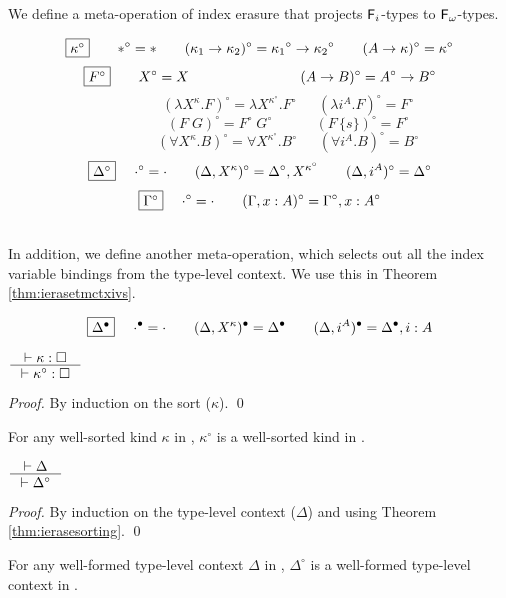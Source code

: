 We define a meta-operation of index erasure that projects $\mathsf{F}_i$-types
to $\mathsf{F}_\omega$-types.
\begin{definition}\label{def:ierase}
\[ \fbox{$\kappa^\circ$}
 ~~~~ ~~
 *^\circ =
 *
 ~~~~ ~~
 (\kappa_1 -> \kappa_2)^\circ =
 {\kappa_1}^\circ -> {\kappa_2}^\circ
 ~~~~ ~~
 (A -> \kappa)^\circ =
 \kappa^\circ
\]
\[ \fbox{$F^\circ$}
 ~~~~ ~~
 X^\circ =
 X
 ~~~~ ~~~~ ~~~~ ~~~~ ~~~~ ~~~~
 (A -> B)^\circ =
 A^\circ -> B^\circ
\]
\[ \qquad \qquad
 (\lambda X^\kappa.F)^\circ =
 \lambda X^{\kappa^\circ}.F^\circ
 ~~~~ ~~~
 (\lambda i^A.F)^\circ =
 F^\circ
\]
\[ \qquad \qquad
 (F\;G)^\circ =
 F^\circ\;G^\circ
 ~~~~ ~~~~ ~~~~ ~~
 (F\,\{s\})^\circ =
 F^\circ
\]
\[ \qquad \qquad
 (\forall X^\kappa . B)^\circ =
 \forall X^{\kappa^\circ} . B^\circ
 ~~~~ ~~~
 (\forall i^A . B)^\circ =
 B^\circ
\]
\[ \fbox{$\Delta^\circ$}
 ~~~~
 \cdot^\circ = \cdot
 ~~~~ ~~
 (\Delta,X^\kappa)^\circ = \Delta^\circ,X^{\kappa^\circ}
 ~~~~ ~~
 (\Delta,i^A)^\circ = \Delta^\circ
\]
\[ \fbox{$\Gamma^\circ$}
 ~~~~
 \cdot^\circ = \cdot
 ~~~~ ~~
 (\Gamma,x:A)^\circ = \Gamma^\circ,x:A^\circ
\]
\end{definition}~\\
In addition, we define another meta-operation, which selects out
all the index variable bindings from the type-level context.
We use this in Theorem \ref{thm:ierasetmctxivs}.
\begin{definition}
        \[ \fbox{$\Delta^\bullet$} ~~~~ \cdot^\bullet = \cdot \qquad
        (\Delta,X^\kappa)^\bullet = \Delta^\bullet \qquad
        (\Delta,i^A)^\bullet = \Delta^\bullet,i:A
\]
\end{definition}



\begin{theorem}
\label{thm:ierasesorting}
        $\inference{|- \kappa : \square}{|- \kappa^\circ : \square}$
\end{theorem}
\begin{proof}
        By induction on the sort ($\kappa$).
        \qed
\end{proof}
\begin{remark}
For any well-sorted kind $\kappa$ in \Fi,
$\kappa^\circ$ is a well-sorted kind in \Fw.
\end{remark}

\begin{theorem}
\label{thm:ierasetyctx}
$ \inference{|- \Delta}{|- \Delta^\circ} $
\end{theorem}
\begin{proof}
        By induction on the type-level context ($\Delta$)
        and using Theorem \ref{thm:ierasesorting}.
        \qed
\end{proof}
\begin{remark}
For any well-formed type-level context $\Delta$ in \Fi,
$\Delta^\circ$ is a well-formed type-level context in \Fw.
\end{remark}

